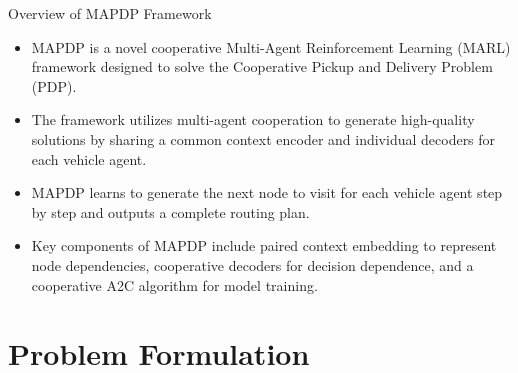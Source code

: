 \documentclass{beamer}
\begin{document}
\begin{frame}{Overview of MAPDP Framework}
	\begin{itemize}
		\item MAPDP is a novel cooperative Multi-Agent Reinforcement Learning (MARL) framework designed to solve the Cooperative Pickup and Delivery Problem (PDP).
		\item The framework utilizes multi-agent cooperation to generate high-quality solutions by sharing a common context encoder and individual decoders for each vehicle agent.
		\item MAPDP learns to generate the next node to visit for each vehicle agent step by step and outputs a complete routing plan.
		\item Key components of MAPDP include paired context embedding to represent node dependencies, cooperative decoders for decision dependence, and a cooperative A2C algorithm for model training.
	\end{itemize}
\end{frame}

\section{Problem Formulation}
\end{document}
